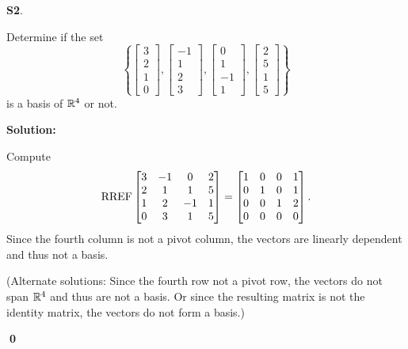 \documentclass{article}
\newenvironment{problem}[1]
{
  \begin{flushleft}
  \textbf{#1}.
  \ignorespaces
}
{
  \end{flushleft}
}
\newenvironment{solution}
{
  \ignorespaces
  \textbf{Solution:}
}
{
  \ignorespacesafterend
  \begin{flushright}
  {\bfseries \qed}
  \end{flushright}
}
\begin{document}
\begin{problem}{S2}
Determine if the set \[ \left\{
 \begin{bmatrix} 3 \\ 2 \\ 1 \\ 0 \end{bmatrix} ,
 \begin{bmatrix} -1 \\ 1 \\ 2 \\ 3 \end{bmatrix} ,
 \begin{bmatrix} 0 \\ 1 \\ -1 \\ 1 \end{bmatrix} ,
 \begin{bmatrix} 2 \\ 5 \\ 1 \\ 5 \end{bmatrix} \right\} \]
is a basis of $\mathbb{R}^4$ or not.
\end{problem}
\begin{solution}
Compute
\[\operatorname{RREF} \begin{bmatrix} 3 & -1 & 0 & 2 \\ 2 & 1 & 1 & 5 \\ 1 & 2 & -1 & 1 \\ 0 & 3 & 1 & 5 \end{bmatrix} =
\begin{bmatrix} 1 & 0 & 0 & 1 \\ 0 & 1 & 0 & 1 \\ 0 & 0 & 1 & 2 \\ 0 & 0 & 0 & 0 \end{bmatrix}.\]
Since the fourth column is not a pivot column, the vectors are linearly
dependent and thus not a basis.

(Alternate solutions:
Since the fourth row not a pivot row, the vectors do not span
\(\mathbb{R}^4\) and thus are not a basis. Or since the resulting matrix is not
the identity matrix, the vectors do not form a basis.)
\end{solution}
\end{document}
